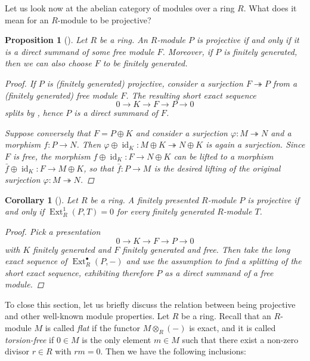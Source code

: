 \documentclass[A4paper, 12pt, british, reqno]{amsart}
\theoremstyle{plain}
\newtheorem{prop}[thm]{Proposition}
\newtheorem{cor}[thm]{Corollary}
\theoremstyle{definition}
\theoremstyle{remark}
\theoremstyle{plain}
\theoremstyle{definition}
\theoremstyle{remark}
\theoremstyle{plain}
\theoremstyle{definition}
\theoremstyle{remark}
\DeclareMathOperator{\Ext}{Ext}
\DeclareMathOperator{\id}{id}
\newcommand{\ot}{\otimes}
\newcommand{\op}{\oplus}
\begin{document}
Let us look now at the abelian category of modules over a ring $R$.
What does it mean for an $R$-module to be projective?

\begin{prop}[{\cite[Lemma 1.1.2]{fra18}}]\label{prop:projective}
    Let $R$ be a ring.
    An $R$-module $P$ is projective if and only if it is a direct summand of some free module $F$.
    Moreover, if $P$ is finitely generated, then we can also choose $F$ to be finitely generated.
    \begin{proof}
	If $P$ is (finitely generated) projective, consider a surjection $F\twoheadrightarrow P$ from a (finitely generated) free module $F$.
	The resulting short exact sequence
	\[ 0 \to K\to F\to P \to 0 \]
	splits by , hence $P$ is a direct summand of $F$.

	Suppose conversely that $F=P\op K$ and consider a surjection $\varphi\colon M\twoheadrightarrow N$ and a morphism $f\colon P\to N$.
	Then $\varphi\op \id_{K} \colon M\op K\twoheadrightarrow N\op K$ is again a surjection.
	Since $F$ is free, the morphism $f\op \id_{K}\colon F\to N\op K$ can be lifted to a morphism $\bar{f}\op \id_{K}\colon F\to M\op K$, so that $\bar{f}\colon P\to M$ is the desired lifting of the original surjection $\varphi\colon M\twoheadrightarrow N$.
    \end{proof}
\end{prop}

{\color{gray}
\begin{cor}[{\cite[Cor.~1.1.28]{fra18}}]
    Let $R$ be a ring.
    A finitely presented $R$-module $P$ is projective if and only if $\Ext^{1}_{R}(P,T)=0$ for every finitely generated $R$-module $T$.
    \begin{proof}
	Pick a presentation
	\[ 0\to K\to F\to P\to 0 \]
	with $K$ finitely generated and $F$ finitely generated and free.
	Then take the long exact sequence of $\Ext^{\bullet}_{R}(P,-)$ and use the assumption to find a splitting of the short exact sequence, exhibiting therefore $P$ as a direct summand of a free module.
    \end{proof}
\end{cor}
}

To close this section, let us briefly discuss the relation between being projective and other well-known module properties.
Let $R$ be a ring.
Recall that an $R$-module $M$ is called \textit{flat} if the functor $M\ot_{R}(-)$ is exact, and it is called \textit{torsion-free} if $0\in M$ is the only element $m\in M$ such that there exist a non-zero divisor $r\in R$ with $rm=0$.
Then we have the following inclusions:
\end{document}
